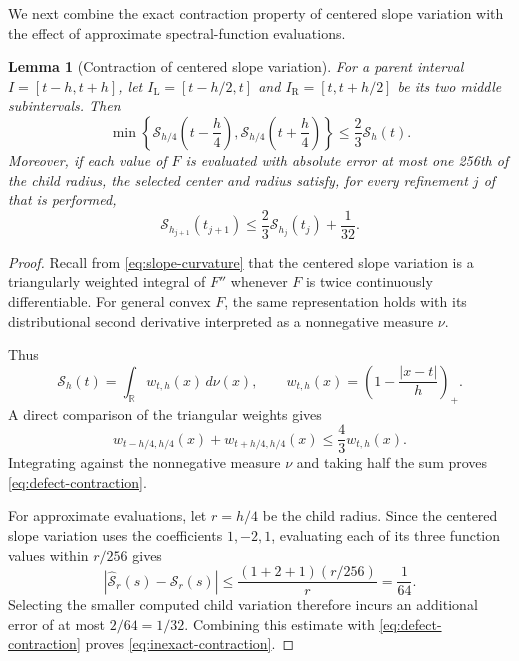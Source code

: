 \documentclass[10pt,a4paper]{article}
\newtheorem{lemma}{Lemma}[section]
\begin{document}
We next combine the exact contraction property
of centered slope variation with the effect of
approximate spectral-function evaluations.



\begin{lemma}[Contraction of centered slope variation]
\label{lem:defect-contraction}
\label{lem:inexact-contraction}
For a parent interval $I=[t-h,t+h]$, let
$I_{\mathrm L}=[t-h/2,t]$ and
$I_{\mathrm R}=[t,t+h/2]$ be its two middle
subintervals. Then
\begin{equation}\label{eq:defect-contraction}
\boxed{
\min\left\{
\mathcal S_{h/4}\left(t-\frac h4\right),
\mathcal S_{h/4}\left(t+\frac h4\right)
\right\}
\leq\frac23\mathcal S_h(t).
}
\end{equation}
Moreover, if each value of $F$ is evaluated with
absolute error at most one 256th of the child
radius, the selected center and radius satisfy,
for every refinement $j$ of 
that is performed,
\begin{equation}\label{eq:inexact-contraction}
\boxed{
\mathcal S_{h_{j+1}}(t_{j+1})
\leq
\frac23\mathcal S_{h_j}(t_j)+\frac1{32}.
}
\end{equation}
\end{lemma}

\begin{proof}
Recall from \eqref{eq:slope-curvature} that
the centered slope variation is a triangularly
weighted integral of $F''$ whenever $F$ is
twice continuously differentiable. For general
convex $F$, the same representation holds with
its distributional second derivative interpreted
as a nonnegative measure $\nu$.

Thus
\[
\mathcal S_h(t)
=\int_{\mathbb R}w_{t,h}(x)\,d\nu(x),
\qquad
w_{t,h}(x)=
\left(1-\frac{|x-t|}{h}\right)_+.
\]
A direct comparison of the triangular weights gives
\[
w_{t-h/4,h/4}(x)+w_{t+h/4,h/4}(x)
\leq\frac43w_{t,h}(x).
\]
Integrating against the nonnegative measure $\nu$
and taking half the sum proves
\eqref{eq:defect-contraction}.

For approximate evaluations, let $r=h/4$
be the child radius. Since the centered slope
variation uses the coefficients $1,-2,1$,
evaluating each of its three function values
within $r/256$ gives
\[
\left|
\widehat{\mathcal S}_r(s)
-\mathcal S_r(s)
\right|
\leq
\frac{(1+2+1)(r/256)}r
=\frac1{64}.
\]
Selecting the smaller computed child variation
therefore incurs an additional error of at most
$2/64=1/32$. Combining this estimate with
\eqref{eq:defect-contraction} proves
\eqref{eq:inexact-contraction}.
\end{proof}
\end{document}
